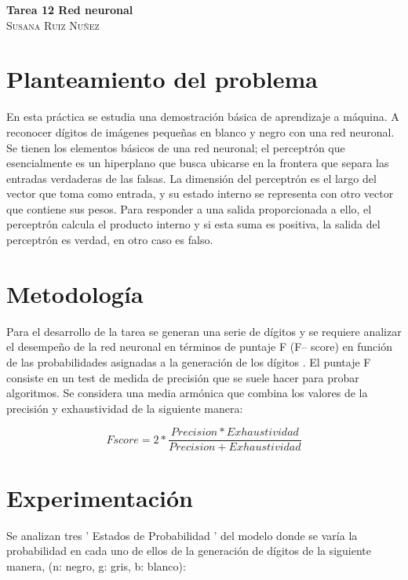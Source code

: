 \documentclass{article}
\begin{document}
	\begin{center}
	\huge{\textbf{Tarea 12 Red neuronal}}\\
	
	\textsc{ \Large Susana Ruiz Nuñez}
	\end{center}


\section{Planteamiento del problema} 
En esta práctica \cite{satu} se estudia una demostración básica de aprendizaje a máquina.  A reconocer dígitos de imágenes pequeñas en blanco y negro con una red neuronal. Se tienen los elementos básicos de una red neuronal; el perceptrón que esencialmente es un hiperplano que busca ubicarse en la frontera que separa las entradas verdaderas de las falsas. La dimensión  del perceptrón es el largo del vector  que toma como entrada, y su estado interno se representa con otro vector que contiene sus pesos. Para responder a una salida proporcionada a ello, el perceptrón calcula el producto interno y si esta suma es positiva, la salida del perceptrón es verdad, en otro caso es falso.

\section{Metodología}
Para el desarrollo de la tarea se generan una serie de dígitos y se requiere analizar el desempeño de la red neuronal en términos de puntaje F (F-- score) en función de las probabilidades asignadas a la generación de los dígitos \cite{metr}. El puntaje F consiste en un test de medida de precisión que se suele hacer para probar algoritmos. Se considera una media armónica que combina los valores de la precisión y exhaustividad de la siguiente manera:

\begin{equation}
	Fscore= 2 * \frac{Precision * Exhaustividad}{Precision + Exhaustividad} 
\end{equation}

\section{Experimentación}

Se analizan tres ' Estados de Probabilidad ' del modelo donde se varía la probabilidad en cada uno de ellos de la generación de dígitos de la siguiente manera,  (n: negro, g: gris, b: blanco): 
\end{document}
